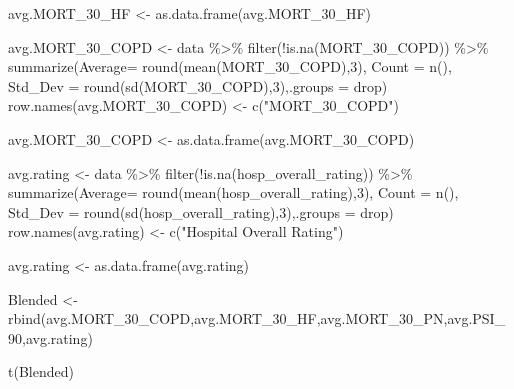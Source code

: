 \documentclass[
]{article}
\newenvironment{Shaded}{\begin{snugshade}}{\end{snugshade}}
\newcommand{\AttributeTok}[1]{\textcolor[rgb]{0.77,0.63,0.00}{#1}}
\newcommand{\DecValTok}[1]{\textcolor[rgb]{0.00,0.00,0.81}{#1}}
\newcommand{\FunctionTok}[1]{\textcolor[rgb]{0.00,0.00,0.00}{#1}}
\newcommand{\NormalTok}[1]{#1}
\newcommand{\OtherTok}[1]{\textcolor[rgb]{0.56,0.35,0.01}{#1}}
\newcommand{\SpecialCharTok}[1]{\textcolor[rgb]{0.00,0.00,0.00}{#1}}
\newcommand{\StringTok}[1]{\textcolor[rgb]{0.31,0.60,0.02}{#1}}
\begin{document}
\begin{Shaded}
\begin{Highlighting}[]
\NormalTok{avg.MORT\_30\_HF }\OtherTok{\textless{}{-}} \FunctionTok{as.data.frame}\NormalTok{(avg.MORT\_30\_HF) }

\NormalTok{avg.MORT\_30\_COPD }\OtherTok{\textless{}{-}} 
\NormalTok{data }\SpecialCharTok{\%\textgreater{}\%} \FunctionTok{filter}\NormalTok{(}\SpecialCharTok{!}\FunctionTok{is.na}\NormalTok{(MORT\_30\_COPD)) }\SpecialCharTok{\%\textgreater{}\%}  
\FunctionTok{summarize}\NormalTok{(}\AttributeTok{Average=} \FunctionTok{round}\NormalTok{(}\FunctionTok{mean}\NormalTok{(MORT\_30\_COPD),}\DecValTok{3}\NormalTok{), }\AttributeTok{Count =} \FunctionTok{n}\NormalTok{(), }\AttributeTok{Std\_Dev =} \FunctionTok{round}\NormalTok{(}\FunctionTok{sd}\NormalTok{(MORT\_30\_COPD),}\DecValTok{3}\NormalTok{),}\AttributeTok{.groups =} \StringTok{\textquotesingle{}drop\textquotesingle{}}\NormalTok{) }
\FunctionTok{row.names}\NormalTok{(avg.MORT\_30\_COPD) }\OtherTok{\textless{}{-}} \FunctionTok{c}\NormalTok{(}\StringTok{"MORT\_30\_COPD"}\NormalTok{)}

\NormalTok{avg.MORT\_30\_COPD }\OtherTok{\textless{}{-}} \FunctionTok{as.data.frame}\NormalTok{(avg.MORT\_30\_COPD) }

\NormalTok{avg.rating }\OtherTok{\textless{}{-}} 
\NormalTok{data }\SpecialCharTok{\%\textgreater{}\%} \FunctionTok{filter}\NormalTok{(}\SpecialCharTok{!}\FunctionTok{is.na}\NormalTok{(hosp\_overall\_rating)) }\SpecialCharTok{\%\textgreater{}\%}  
\FunctionTok{summarize}\NormalTok{(}\AttributeTok{Average=} \FunctionTok{round}\NormalTok{(}\FunctionTok{mean}\NormalTok{(hosp\_overall\_rating),}\DecValTok{3}\NormalTok{), }\AttributeTok{Count =} \FunctionTok{n}\NormalTok{(), }\AttributeTok{Std\_Dev =} \FunctionTok{round}\NormalTok{(}\FunctionTok{sd}\NormalTok{(hosp\_overall\_rating),}\DecValTok{3}\NormalTok{),}\AttributeTok{.groups =} \StringTok{\textquotesingle{}drop\textquotesingle{}}\NormalTok{) }
\FunctionTok{row.names}\NormalTok{(avg.rating) }\OtherTok{\textless{}{-}} \FunctionTok{c}\NormalTok{(}\StringTok{"Hospital Overall Rating"}\NormalTok{)}

\NormalTok{avg.rating }\OtherTok{\textless{}{-}} \FunctionTok{as.data.frame}\NormalTok{(avg.rating) }


\NormalTok{Blended }\OtherTok{\textless{}{-}} \FunctionTok{rbind}\NormalTok{(avg.MORT\_30\_COPD,avg.MORT\_30\_HF,avg.MORT\_30\_PN,avg.PSI\_90,avg.rating)}

\FunctionTok{t}\NormalTok{(Blended)}
\end{Highlighting}
\end{Shaded}
\end{document}
